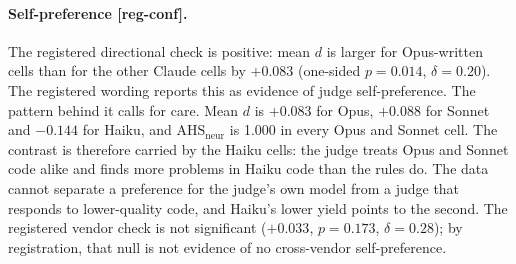 \documentclass[10pt,a4paper]{article}
\newcommand{\regC}{\textsf{\scriptsize[reg-conf]}}  %
\newcommand{\AHSn}{\mathrm{AHS}_{\mathrm{neur}}}
\begin{document}
\paragraph{Self-preference \regC{}.} The registered directional check is positive: mean $d$ is larger for
Opus-written cells than for the other Claude cells by $+0.083$ (one-sided $p = 0.014$, $\delta = 0.20$).
The registered wording reports this as evidence of judge self-preference. The pattern behind it calls for care.
Mean $d$ is $+0.083$ for Opus, $+0.088$ for Sonnet and $-0.144$ for Haiku, and $\AHSn$ is 1.000 in every Opus and
Sonnet cell. %
The contrast is therefore carried by the Haiku cells: the judge treats Opus and Sonnet code alike and finds more
problems in Haiku code than the rules do. The data cannot separate a preference for the judge's own model from a
judge that responds to lower-quality code, and Haiku's lower yield points to the second. The registered vendor check
is not significant ($+0.033$, $p = 0.173$, $\delta = 0.28$); by registration, that null is not evidence of no
cross-vendor self-preference. %
\end{document}
